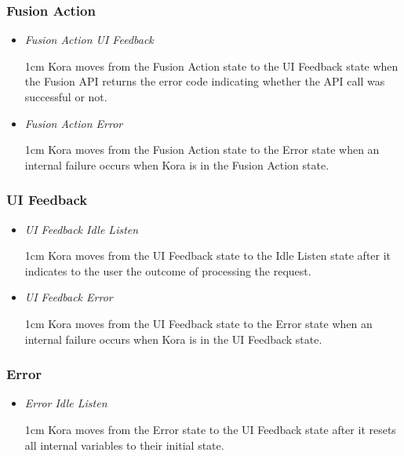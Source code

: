 \documentclass[onecolumn, draftclsnofoot,10pt, compsoc]{IEEEtran}
\def \botname{Kora\xspace}
\newenvironment{indentItem}[1][1cm]{\begin{adjustwidth}{#1}{}}{\end{adjustwidth}}
\begin{document}
	\subsubsection{Fusion Action}
	\begin{itemize}
		\item \textit{Fusion Action \textrightarrow{} UI Feedback}
		\begin{indentItem}
			\botname moves from the Fusion Action state to the UI Feedback state when the Fusion API returns the error code indicating whether the API call was successful or not.
		\end{indentItem}
		\item \textit{Fusion Action \textrightarrow{} Error}
		\begin{indentItem}
			\botname moves from the Fusion Action state to the Error state when an internal failure occurs when \botname is in the Fusion Action state.
		\end{indentItem}
	\end{itemize}

	\subsubsection{UI Feedback}
	\begin{itemize}
		\item \textit{UI Feedback \textrightarrow{} Idle Listen}
		\begin{indentItem}
			\botname moves from the UI Feedback state to the Idle Listen state after it indicates to the user the outcome of processing the request.
		\end{indentItem}
		\item \textit{UI Feedback \textrightarrow{} Error}
		\begin{indentItem}
			\botname moves from the UI Feedback state to the Error state when an internal failure occurs when \botname is in the UI Feedback state.
		\end{indentItem}
	\end{itemize}

	\subsubsection{Error}
	\begin{itemize}
		\item \textit{Error \textrightarrow{} Idle Listen}
		\begin{indentItem}
			\botname moves from the Error state to the UI Feedback state after it resets all internal variables to their initial state.
		\end{indentItem}
	\end{itemize}
\end{document}
